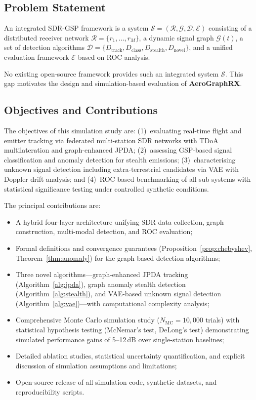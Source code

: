 \documentclass[sensors,article,submit,pdftex]{mdpi}
\begin{document}
\subsection{Problem Statement}
\begin{definition}
An integrated SDR-GSP framework is a system $\mathcal{S} = (\mathcal{R}, \mathcal{G}, \mathcal{D}, \mathcal{E})$ consisting of a distributed receiver network $\mathcal{R} = \{r_1, \ldots, r_M\}$, a dynamic signal graph $\mathcal{G}(t)$, a set of detection algorithms $\mathcal{D} = \{D_{\text{track}}, D_{\text{class}}, D_{\text{stealth}}, D_{\text{novel}}\}$, and a unified evaluation framework $\mathcal{E}$ based on ROC analysis.
\end{definition}

\noindent No existing open-source framework provides such an integrated system $\mathcal{S}$. This gap motivates the design and simulation-based evaluation of \textbf{AeroGraphRX}.

\subsection{Objectives and Contributions}
The objectives of this simulation study are: (1)~evaluating real-time flight and emitter tracking via federated multi-station SDR networks with TDoA multilateration and graph-enhanced JPDA; (2)~assessing GSP-based signal classification and anomaly detection for stealth emissions; (3)~characterising unknown signal detection including extra-terrestrial candidates via VAE with Doppler drift analysis; and (4)~ROC-based benchmarking of all sub-systems with statistical significance testing under controlled synthetic conditions.

The principal contributions are:
\begin{itemize}[nosep,leftmargin=*]
    \item A hybrid four-layer architecture unifying SDR data collection, graph construction, multi-modal detection, and ROC evaluation;
    \item Formal definitions and convergence guarantees (Proposition~\ref{prop:chebyshev}, Theorem~\ref{thm:anomaly}) for the graph-based detection algorithms;
    \item Three novel algorithms---graph-enhanced JPDA tracking (Algorithm~\ref{alg:jpda}), graph anomaly stealth detection (Algorithm~\ref{alg:stealth}), and VAE-based unknown signal detection (Algorithm~\ref{alg:vae})---with computational complexity analysis;
    \item Comprehensive Monte Carlo simulation study ($N_{\text{MC}} = 10{,}000$ trials) with statistical hypothesis testing (McNemar's test, DeLong's test) demonstrating simulated performance gains of 5--12\,dB over single-station baselines;
    \item Detailed ablation studies, statistical uncertainty quantification, and explicit discussion of simulation assumptions and limitations;
    \item Open-source release of all simulation code, synthetic datasets, and reproducibility scripts.
\end{itemize}
\end{document}
